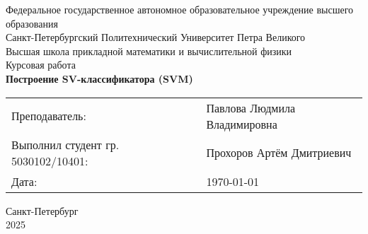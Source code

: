 \begin{center} %
    \large{Федеральное государственное автономное образовательное учреждение высшего образования}\\
    \Large{Санкт-Петербургский Политехнический Университет Петра Великого}\\
    \Large{Высшая школа прикладной математики и вычислительной физики}\\
    \vspace{6cm}
    \Large{Курсовая работа} \\
    \textbf{\Huge{Построение SV-классификатора (SVM)}}\\

    \vspace{4cm}
    \large

    \centering
    \begin{tabular}{lcl}
        Преподаватель:                       & \hspace{0.6cm} & Павлова Людмила Владимировна \\
        Выполнил студент гр. 5030102/10401:&                &
                                             Прохоров Артём Дмитриевич\\
        Дата:                                &                & \today\\
    \end{tabular}
    
    \vspace{\fill}
    Санкт-Петербург\\
    2025
\end{center}

